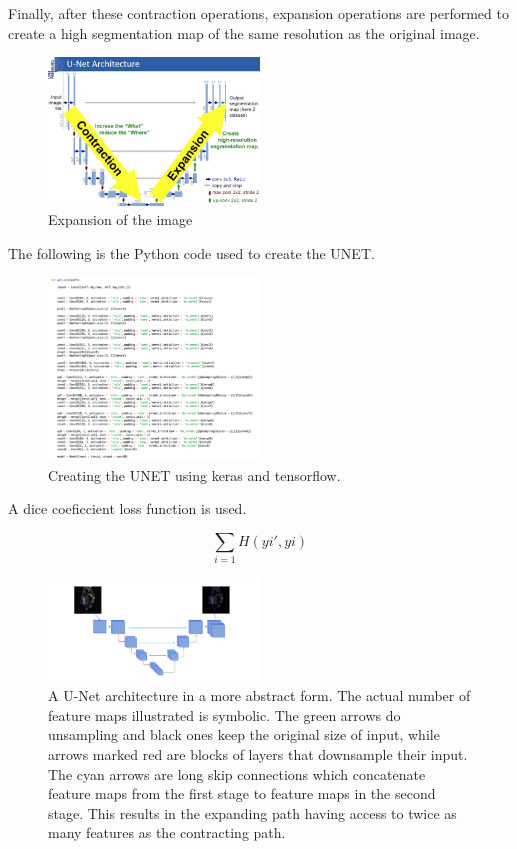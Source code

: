 \documentclass[letterpaper]{article}
\begin{document}
Finally, after these contraction operations, expansion operations are performed to create a high segmentation map of the same resolution as the original image.  	

 \begin{figure}[H]
  \centerline{\includegraphics[width=0.5\textwidth]{Images/UNET3.png}}
  \caption{Expansion of the image}
  \label{fig:unet3}
\end{figure}


The following is the Python code used to create the UNET. 

 \begin{figure}[H]
  \centerline{\includegraphics[width=0.5\textwidth]{Images/KerasUNET.png}}
  \caption{Creating the UNET using keras and tensorflow.}
  \label{fig:kerasunet3}
\end{figure}

A dice coeficcient loss function is used. 

$$\sum_{i=1} H(yi', yi)$$

 \begin{figure}[H]
  \centerline{\includegraphics[width=0.5\textwidth]{Images/UNETMedical.png}}
  \caption{A U-Net architecture in a more abstract form. The actual number of feature maps illustrated is symbolic. The green arrows do unsampling and black ones keep the original size of input, while arrows marked red are blocks of layers that downsample their input. The cyan arrows are long skip connections which concatenate feature maps from the first stage to feature maps in the second stage. This results in the expanding path having access to twice as many features as the contracting path.}
  \label{fig:kerasunet3}
\end{figure}
\end{document}
